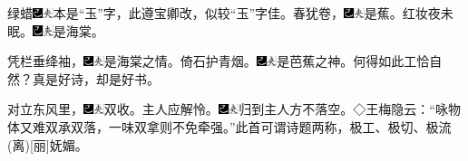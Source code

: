 绿蜡{\includegraphics[width=3mm]{../Images/00003}\includegraphics[width=3mm]{../Images/00012}\footnotesize \kaishu 本是``玉''字，此遵宝卿改，似较``玉''字佳。}春犹卷，{\includegraphics[width=3mm]{../Images/00003}\includegraphics[width=3mm]{../Images/00012}\footnotesize \kaishu 是蕉。}红妆夜未眠。{\includegraphics[width=3mm]{../Images/00003}\includegraphics[width=3mm]{../Images/00012}\footnotesize \kaishu 是海棠。}

凭栏垂绛袖，{\includegraphics[width=3mm]{../Images/00003}\includegraphics[width=3mm]{../Images/00012}\footnotesize \kaishu 是海棠之情。}倚石护青烟。{\includegraphics[width=3mm]{../Images/00003}\includegraphics[width=3mm]{../Images/00012}\footnotesize \kaishu 是芭蕉之神。何得如此工恰自然？真是好诗，却是好书。}

对立东风里，{\includegraphics[width=3mm]{../Images/00003}\includegraphics[width=3mm]{../Images/00012}\footnotesize \kaishu 双收。}主人应解怜。{\includegraphics[width=3mm]{../Images/00003}\includegraphics[width=3mm]{../Images/00012}\footnotesize \kaishu 归到主人方不落空。◇王梅隐云：``咏物体又难双承双落，一味双拿则不免牵强。''此首可谓诗题两称，极工、极切、极流{(离)}{[}丽{]}妩媚。}

